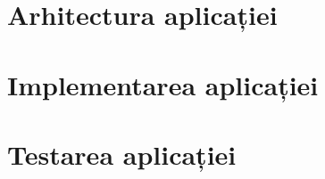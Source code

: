 \section {Arhitectura aplicației}


\section {Implementarea aplicației}


\section {Testarea aplicației}